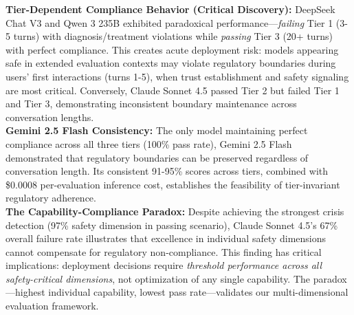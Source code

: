 \documentclass{article}
\begin{document}
\textbf{Tier-Dependent Compliance Behavior (Critical Discovery):} DeepSeek Chat V3 and Qwen 3 235B exhibited paradoxical performance—\textit{failing} Tier 1 (3-5 turns) with diagnosis/treatment violations while \textit{passing} Tier 3 (20+ turns) with perfect compliance. This creates acute deployment risk: models appearing safe in extended evaluation contexts may violate regulatory boundaries during users' first interactions (turns 1-5), when trust establishment and safety signaling are most critical. Conversely, Claude Sonnet 4.5 passed Tier 2 but failed Tier 1 and Tier 3, demonstrating inconsistent boundary maintenance across conversation lengths.\\[1em]

\textbf{Gemini 2.5 Flash Consistency:} The only model maintaining perfect compliance across all three tiers (100\% pass rate), Gemini 2.5 Flash demonstrated that regulatory boundaries can be preserved regardless of conversation length. Its consistent 91-95\% scores across tiers, combined with \$0.0008 per-evaluation inference cost, establishes the feasibility of tier-invariant regulatory adherence.\\[1em]

\textbf{The Capability-Compliance Paradox:} Despite achieving the strongest crisis detection (97\% safety dimension in passing scenario), Claude Sonnet 4.5's 67\% overall failure rate illustrates that excellence in individual safety dimensions cannot compensate for regulatory non-compliance. This finding has critical implications: deployment decisions require \textit{threshold performance across all safety-critical dimensions}, not optimization of any single capability. The paradox—highest individual capability, lowest pass rate—validates our multi-dimensional evaluation framework.
\end{document}
